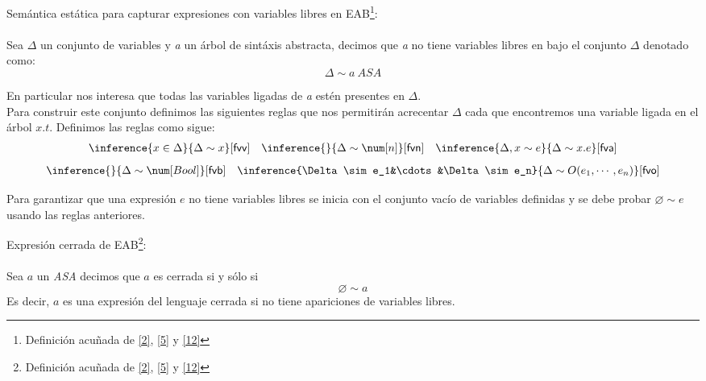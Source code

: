    \begin{definition}Semántica estática para capturar expresiones con variables libres en \textsf{EAB}\footnote{Definición acuñada de \hyperlink{2}{[2]}, \hyperlink{5}{[5]} y  \hyperlink{12}{[12]} }:\\\\
    Sea $\Delta$ un conjunto de variables y \textit{a} un árbol de sintáxis abstracta, decimos que \textit{a} no tiene variables libres en bajo el conjunto $\Delta$ denotado como:
        $$ \Delta\sim a\ ASA$$
    
    En particular nos interesa que todas las variables ligadas de \textit{a} estén presentes en $\Delta$.\\
    Para construir este conjunto definimos las siguientes reglas que nos permitirán acrecentar $\Delta$ cada que encontremos una variable ligada en el árbol $x.t$. Definimos las reglas como sigue:
    \[
        \begin{array}{ccc}
            \inference{x\in\Delta}{\Delta\sim x}[\textsf{fvv}]&
            \inference{}{\Delta\sim\num[n]}[\textsf{fvn}]&
            \inference{\Delta,x\sim e}{\Delta\sim x.e}[\textsf{fva}]
        \end{array}
    \]
    \bigskip
    \[
        \begin{array}{cc}
            \inference{}{\Delta\sim\num[Bool]}[{\sf fvb}]&
            \inference{\Delta\sim e_1&\cdots&\Delta\sim e_n}{\Delta\sim O(e_1,\cdots,e_n)}[{\sf fvo}]
        \end{array}
    \]

    \bigskip
    
    Para garantizar que una expresión $e$ no tiene variables libres se inicia con el conjunto vacío de variables definidas y se debe probar $\varnothing\sim e$ usando las reglas anteriores.
    \end{definition}

    \bigskip

    \begin{definition}Expresión cerrada de \textsf{EAB}\footnote{Definición acuñada de \hyperlink{2}{[2]}, \hyperlink{5}{[5]} y  \hyperlink{12}{[12]}}:\\\\
    Sea $a$ un \textit{ASA} decimos que $a$ es cerrada si y sólo si $$\varnothing\sim a$$
    Es decir, $a$ es una expresión del lenguaje cerrada si no tiene apariciones de variables libres. 
    \end{definition}

    \bigskip

